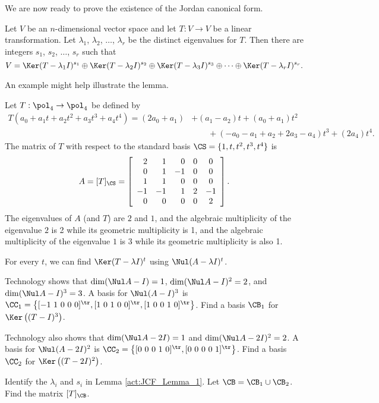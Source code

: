 \label{sec:jordan}

We are now ready to prove the existence of the Jordan canonical form.

 \begin{lemma} \label{lem:JCF_1} Let $V$ be an $n$-dimensional vector space and let $T: V \to V$ be a linear transformation. Let $\lambda_1$, $\lambda_2$, $\ldots$, $\lambda_r$ be the distinct eigenvalues for $T$.  Then there are integers $s_1$, $s_2$, $\ldots$, $s_r$ such that 
 \[V = \Ker(T-\lambda_1 I)^{s_1} \oplus \Ker(T-\lambda_2 I)^{s_2} \oplus \Ker(T-\lambda_3 I)^{s_3} \oplus \cdots \oplus \Ker(T-\lambda_r I)^{s_r}.\]
 \end{lemma}
 
An example might help illustrate the lemma. 

\begin{activity} \label{act:JCF_Lemma_1} Let $T:\pol_4 \to \pol_4$ be defined by 
\begin{align*}
T\left(a_0+a_1t+a_2t^2+a_3t^3+a_4t^4\right) = (2a_0+a_1) &+ (a_1-a_2)t + (a_0+a_1)t^2 \\
	&\qquad + (-a_0-a_1+a_2+2a_3-a_4)t^3 + (2a_4)t^4.
\end{align*}
The matrix of $T$ with respect to the standard basis $\CS = \{1,t,t^2,t^3,t^4\}$ is 
\[A = [T]_{\CS} = \left[ \begin{array}{rrrcc} 2&1&0&0&0\\0&1&-1&0&0 \\ 1&1&0&0&0 \\ -1&-1&1&2&-1 \\ 0&0&0&0&2 \end{array} \right].\]
The eigenvalues of $A$ (and $T$) are $2$ and $1$, and the algebraic multiplicity of the eigenvalue $2$ is 2 while its geometric multiplicity is 1, and the algebraic multiplicity of the eigenvalue $1$ is 3 while its geometric multiplicity is also 1.  

For every $t$, we can find $\Ker(T-\lambda I)^t$ using $\Nul (A- \lambda I)^t$. 
\ba
\item Technology shows that $\dim(\Nul A-I) = 1$, $\dim(\Nul A-I)^2 = 2$, and $\dim(\Nul A-I)^3 = 3$. A basis for $\Nul (A-I)^3$ is $\CC_1 = \left\{ [-1 \ 1 \ 0 \ 0 \ 0]^{\tr}, [1 \ 0 \ 1 \ 0 \ 0]^{\tr}, [1 \ 0 \ 0 \ 1 \ 0]^{\tr}\right\}$. Find a basis $\CB_1$ for $\Ker\left((T-I)^3\right)$.

\item Technology also shows that $\dim(\Nul A-2I) = 1$ and $\dim(\Nul A-2I)^2 = 2$. A basis for $\Nul (A-2I)^2$ is $\CC_2 = \left\{ [0 \ 0 \ 0 \ 1 \ 0]^{\tr}, [0 \ 0 \ 0 \ 0 \ 1]^{\tr}\right\}$. Find a basis $\CC_2$ for $\Ker\left((T-2I)^2\right)$.

\item Identify the $\lambda_i$ and $s_i$ in Lemma \ref{act:JCF_Lemma_1}. Let $\CB = \CB_1 \cup \CB_2$. Find the matrix $[T]_{\CB}$. 

\ea

\end{activity}

